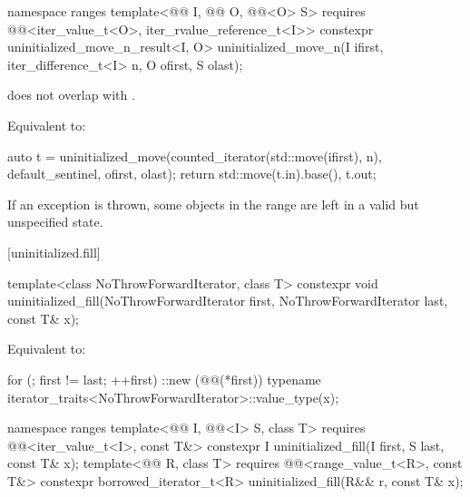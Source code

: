 %
\begin{itemdecl}
namespace ranges {
  template<@@ I, @@ O, @@<O> S>
    requires @@<iter_value_t<O>, iter_rvalue_reference_t<I>>
    constexpr uninitialized_move_n_result<I, O>
      uninitialized_move_n(I ifirst, iter_difference_t<I> n, O ofirst, S olast);
}
\end{itemdecl}

\begin{itemdescr}
\pnum
\expects
{} does not overlap with .

\pnum
\effects
Equivalent to:
\begin{codeblock}
auto t = uninitialized_move(counted_iterator(std::move(ifirst), n),
                            default_sentinel, ofirst, olast);
return {std::move(t.in).base(), t.out};
\end{codeblock}

\pnum
\begin{note}
If an exception is thrown, some objects in the range
are left in a valid but unspecified state.
\end{note}
\end{itemdescr}

[uninitialized.fill]{}

%
\begin{itemdecl}
template<class NoThrowForwardIterator, class T>
  constexpr void uninitialized_fill(NoThrowForwardIterator first,
                                    NoThrowForwardIterator last, const T& x);
\end{itemdecl}

\begin{itemdescr}
\pnum
\effects
Equivalent to:
\begin{codeblock}
for (; first != last; ++first)
  ::new (@@(*first))
    typename iterator_traits<NoThrowForwardIterator>::value_type(x);
\end{codeblock}
\end{itemdescr}

%
\begin{itemdecl}
namespace ranges {
  template<@@ I, @@<I> S, class T>
    requires @@<iter_value_t<I>, const T&>
    constexpr I uninitialized_fill(I first, S last, const T& x);
  template<@@ R, class T>
    requires @@<range_value_t<R>, const T&>
    constexpr borrowed_iterator_t<R> uninitialized_fill(R&& r, const T& x);
}
\end{itemdecl}

